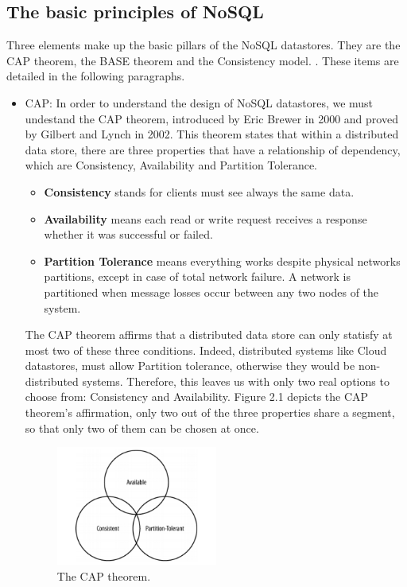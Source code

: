 \subsection{The basic principles of NoSQL}
Three elements make up the basic pillars of the NoSQL datastores. They are the CAP theorem, the BASE theorem and the Consistency model. \cite{wang2012nosql}. These items are detailed in the following paragraphs.
\par
\begin{itemize}

\item CAP:
 In order to understand the design of NoSQL datastores, we must undestand  the CAP theorem, introduced by Eric Brewer in 2000 \cite{CAP} and proved by Gilbert and Lynch \cite{ProbeCAP} in 2002. This theorem states that within a distributed data store, there are three properties that have a relationship of dependency, which are Consistency, Availability and Partition Tolerance.
\begin{itemize}
\item \textbf{Consistency} stands for clients must see always the same data.
\item \textbf{Availability} means each read or write request receives a response whether it was successful or failed.
\item \textbf{Partition Tolerance} means everything works despite physical networks partitions, except in case of total network failure. A network is partitioned when message losses occur between any two nodes of the system.
\end{itemize}

The CAP theorem affirms that a distributed data store can only statisfy at most two of these three conditions. Indeed, distributed systems like Cloud datastores, must allow Partition tolerance, otherwise they would be non-distributed systems. Therefore, this leaves us with only two real options to choose from: Consistency and Availability. Figure 2.1 depicts the CAP theorem's affirmation, only two out of the three properties share a segment, so that only two of them can be chosen at once.

\begin{figure}[htb]
\centering
\includegraphics[width=0.5\textwidth]{./images/CAP.png}
\caption{The CAP theorem.} \label{fig:CAP}
\end{figure}


\end{itemize}

